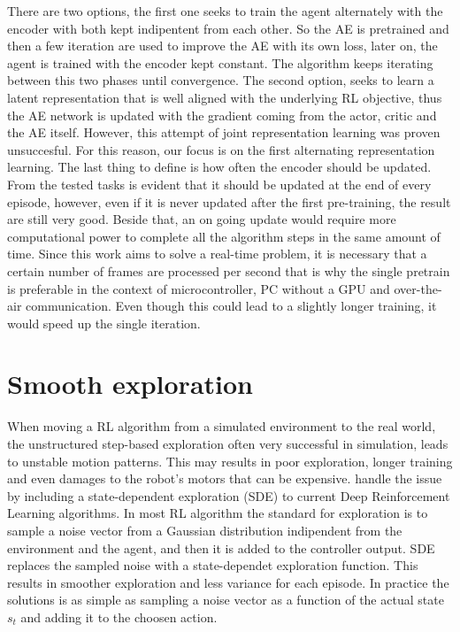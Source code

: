 There are two options, the first one seeks to train the agent alternately with the encoder with both kept indipentent from each other. So the AE is pretrained and then a few iteration are used to improve the AE with its own loss, later on, the agent is trained with the encoder kept constant. The algorithm keeps iterating between this two phases until convergence. The second option, seeks to learn a latent representation that is well aligned with the underlying RL objective, thus the AE network is updated with the gradient coming from the actor, critic and the AE itself. However, this attempt of joint representation learning was proven unsuccesful. For this reason, our focus is on the first alternating representation learning. The last thing to define is how often the encoder should be updated. From the tested tasks is evident that it should be updated at the end of every episode, however, even if it is never updated after the first pre-training, the result are still very good. Beside that, an on going update would require more computational power to complete all the algorithm steps in the same amount of time. Since this work aims to solve a real-time problem, it is necessary that a certain number of frames are processed per second that is why the single pretrain is preferable in the context of microcontroller, PC without a GPU and over-the-air communication. Even though this could lead to a slightly longer training, it would speed up the single iteration.

\section{Smooth exploration}

When moving a RL algorithm from a simulated environment to the real world, the unstructured step-based exploration often very successful in simulation, leads to unstable motion patterns. This may results in poor exploration, longer training and even damages to the robot's motors that can be expensive. \citet{pmlr-v164-raffin22a} handle the issue by including a state-dependent exploration (SDE) to current Deep Reinforcement Learning algorithms. In most RL algorithm the standard for exploration is to sample a noise vector from a Gaussian distribution indipendent from the environment and the agent, and then it is added to the controller output. SDE replaces the sampled noise with a state-dependet exploration function. This results in smoother exploration and less variance for each episode. In practice the solutions is as simple as sampling a noise vector as a function of the actual state $s_t$ and adding it to the choosen action.

